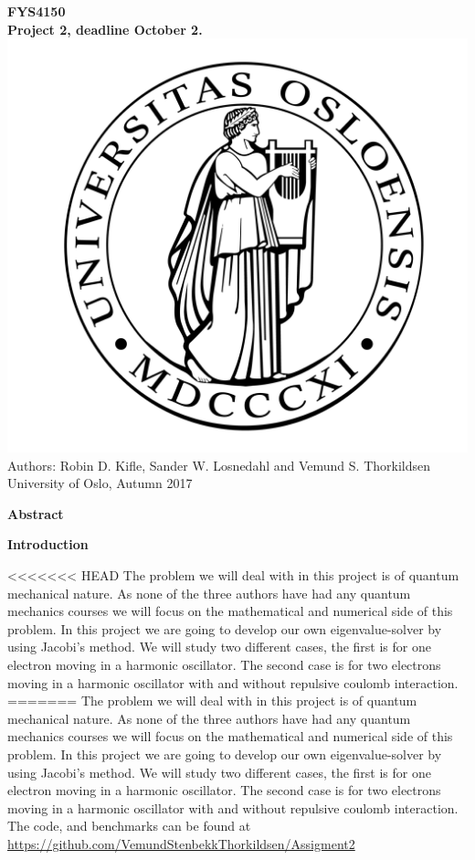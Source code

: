 \documentclass[10pt,a4paper]{article}
\begin{document}
\begin{center}
{\LARGE\bf
FYS4150\\
Project 2, deadline October 2.
}
 \includegraphics[scale=0.1]{uio.png}\\
Authors: Robin D. Kifle, Sander W. Losnedahl and Vemund S. Thorkildsen\\
University of Oslo, Autumn 2017

{\LARGE\bf Abstract}
\end{center}
\newpage

\begin{center}
{\LARGE\bf Introduction}
\end{center}
<<<<<<< HEAD
The problem we will deal with in this project is of quantum mechanical nature. As none of the three authors have had any quantum mechanics courses we will focus on the mathematical and numerical side of this problem. In this project we are going to develop our own eigenvalue-solver by using Jacobi's method. We will study two different cases, the first is for one electron moving in a harmonic oscillator. The second case is for two electrons moving in a harmonic oscillator with and without repulsive coulomb interaction.
=======
The problem we will deal with in this project is of quantum mechanical nature. As none of the three authors have had any quantum mechanics courses we will focus on the mathematical and numerical side of this problem. In this project we are going to develop our own eigenvalue-solver by using Jacobi's method. We will study two different cases, the first is for one electron moving in a harmonic oscillator. The second case is for two electrons moving in a harmonic oscillator with and without repulsive coulomb interaction. The code, and benchmarks can be found at \url{https://github.com/VemundStenbekkThorkildsen/Assigment2} \\
\end{document}
